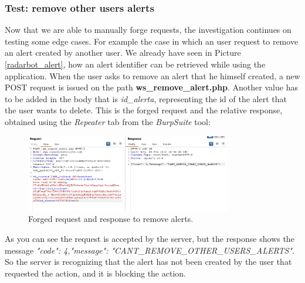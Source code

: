 		\subsubsection{Test: remove other users alerts}
			\par Now that we are able to manually forge requests, the investigation continues on testing some edge cases. For example the case in which an user request to remove an alert created by another user. We already have seen in Picture \ref{radarbot_alert}, how an alert identifier can be retrieved while using the application. \newline
			When the user asks to remove an alert that he himself created, a new POST request is issued on the path \textbf{ws\_remove\_alert.php}. Another value has to be added in the body that is \textit{id\_alerta}, representing the id of the alert that the user wants to delete. This is the forged request and the relative response, obtained using the \textit{Repeater} tab from the \textit{BurpSuite} tool:
			\begin{figure}[H]
				\centering
				\includegraphics[width=0.8\textwidth]{images/radarbot_removealert.png}
				\caption{Forged request and response to remove alerts.}
			\end{figure}
			\par As you can see the request is accepted by the server, but the response shows the message \textit
{"code": 4,"message": "CANT\_REMOVE\_OTHER\_USERS\_ALERTS"}. So the server is recognizing that the alert has not been created by the user that requested the action, and it is blocking the action.

